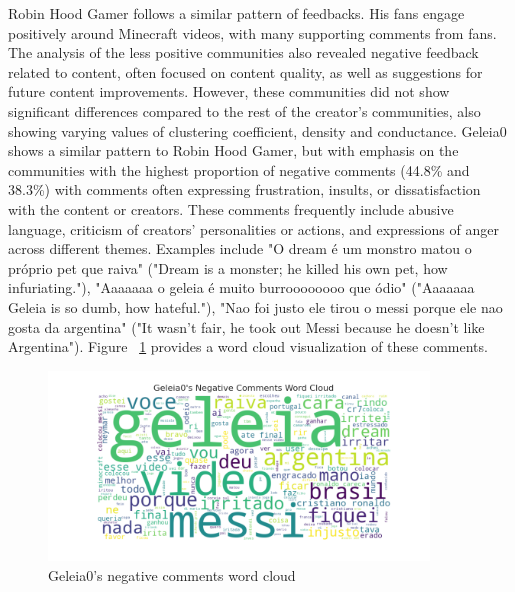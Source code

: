 \documentclass[12pt]{article}
\begin{document}
Robin Hood Gamer follows a similar pattern of feedbacks. His fans engage positively around Minecraft videos, 
with many supporting comments from fans. 
The analysis of the less positive communities also revealed 
negative feedback related to content, often focused on content quality, as well as suggestions for future 
content improvements. However, these communities did not show significant differences compared to the rest of 
the creator's communities, also showing varying values of clustering coefficient, density and conductance.
Geleia0 shows a similar pattern to Robin Hood Gamer, but with emphasis on the communities with the highest proportion of
negative comments (44.8\% and 38.3\%) with comments often expressing frustration, insults, or dissatisfaction with the content 
or creators. These comments frequently include abusive language, criticism of creators' personalities 
or actions, and expressions of anger across different themes. Examples include 
"O dream é um monstro matou o próprio pet que raiva" ("Dream is a monster; he killed his own pet, how infuriating."), 
"Aaaaaaa o geleia é muito burroooooooo que ódio" ("Aaaaaaa Geleia is so dumb, how hateful."), 
"Nao foi justo ele tirou o messi porque ele nao gosta da argentina" ("It wasn't fair, he took out Messi because he doesn't like Argentina").
Figure ~\ref{fig:geleia_comments} provides a word cloud visualization of these comments.  

\begin{figure}[hbt!]
    \centering
    \includegraphics[keepaspectratio,width=0.9\textwidth]{./imgs/geleia/negative_comments.png}
    \caption[width=\textwidth]{Geleia0's negative comments word cloud}
    \label{fig:geleia_comments}
\end{figure}
\end{document}
